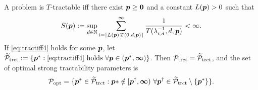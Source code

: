 \documentclass[11pt,a4paper]{article}
\begin{document}
\bigskip

\begin{theorem}\label{thm_main_tract2}
A problem is $T$-tractable iff there exist $\boldsymbol{p}\ge \boldsymbol{0}$ and a constant $L(\boldsymbol{p}) > 0$ such that
\begin{equation} \label{eq:tractiff4}
     S(\boldsymbol{p}):=\sup_{d \in \mathbb{N}}
     \sum_{i = \lceil L(\boldsymbol{p})\, T(0,d,\boldsymbol{p}) \rceil}^\infty \frac{1}{T(\lambda^{-1}_{i,d},d,\boldsymbol{p})}< \infty.
\end{equation}
If \eqref{eq:tractiff4} holds for some $\boldsymbol{p}$, let  $\widetilde{\mathcal{P}}_{\textup{trct}} : = \{\boldsymbol{p}^* : \eqref{eq:tractiff4} \text{ holds }\forall \boldsymbol{p} \in (\boldsymbol{p}^*,\boldsymbol{\infty})\}$.  Then $\mathcal{P}_{\textup{trct}} = \widetilde{\mathcal{P}}_{\textup{trct}}$, and the set of optimal strong tractability parameters is
\[
\mathcal{P}_{\textup{opt}} =
\{\boldsymbol{p}^* \in \widetilde{\mathcal{P}}_{\textup{trct}} :  \boldsymbol{p}* \notin [\boldsymbol{p}^\dagger,\boldsymbol{\infty}) \ \forall \boldsymbol{p}^\dagger \in  \widetilde{\mathcal{P}}_{\textup{trct}} \setminus \{\boldsymbol{p}^*\} \}.
\]\end{theorem}
\end{document}
